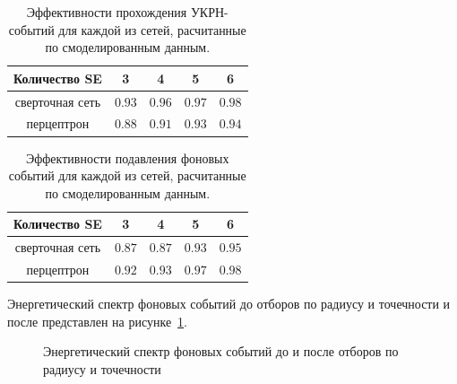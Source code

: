 \begin{table}[H]
    \centering
    \caption{Эффективности прохождения УКРН-событий для каждой из сетей, расчитанные по смоделированным данным.}  
\begin{tabular}{|c|c|c|c|c|}
\hline Количество SE & 3 & 4 & 5 & 6 \\
\hline сверточная сеть & $0.93$ & $0.96$ & $0.97$ & $0.98$ \\
\hline перцептрон & $0.88$ & $0.91$ & $0.93$ & $0.94$ \\
\hline
\end{tabular}
\label{NNeffcevns}
\end{table}

\begin{table}[H]
    \centering
    \caption{Эффективности подавления фоновых событий для каждой из сетей, расчитанные по смоделированным данным.}  
\begin{tabular}{|c|c|c|c|c|}
\hline Количество SE & 3 & 4 & 5 & 6 \\
\hline сверточная сеть & $0.87$ & $0.87$ & $0.93$ & $0.95$ \\
\hline перцептрон & $0.92$ & $0.93$ & $0.97$ & $0.98$ \\
\hline
\end{tabular}
\label{NNeffbckg}
\end{table}

Энергетический спектр фоновых событий до отборов по радиусу и точечности и после представлен на рисунке~\ref{img:bckgspecrtum}.
\begin{figure}[H]
	\caption{Энергетический спектр фоновых событий до и после отборов по радиусу и точечности}
	\label{img:bckgspecrtum}
\end{figure}


